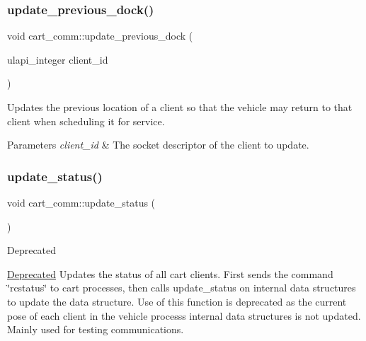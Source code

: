\subsubsection{\texorpdfstring{update\+\_\+previous\+\_\+dock()}{update\_previous\_dock()}}
{\footnotesize\ttfamily void cart\+\_\+comm\+::update\+\_\+previous\+\_\+dock (\begin{DoxyParamCaption}\item[{ulapi\+\_\+integer}]{client\+\_\+id }\end{DoxyParamCaption})}

Updates the previous location of a client so that the vehicle may return to that client when scheduling it for service. 
\begin{DoxyParams}{Parameters}
{\em client\+\_\+id} & The socket descriptor of the client to update. \\
\hline
\end{DoxyParams}
\mbox{\label{classcart__comm_ac3827fcfb77461137bf7a061471c7feb}} 
\subsubsection{\texorpdfstring{update\+\_\+status()}{update\_status()}\hspace{0.1cm}{\footnotesize\ttfamily [1/2]}}
{\footnotesize\ttfamily void cart\+\_\+comm\+::update\+\_\+status (\begin{DoxyParamCaption}{ }\end{DoxyParamCaption})}

\begin{DoxyRefDesc}{Deprecated}
\item[\hyperlink{deprecated__deprecated000001}{Deprecated}]Updates the status of all cart clients. First sends the command \char`\"{}rcstatus\char`\"{} to cart processes, then calls update\+\_\+status on internal data structures to update the data structure. Use of this function is deprecated as the current pose of each client in the vehicle process\textquotesingle{}s internal data structures is not updated. Mainly used for testing communications. \end{DoxyRefDesc}
\mbox{\label{classcart__comm_a6724898e4c76e4e802c4bc6b814130bc}} 
